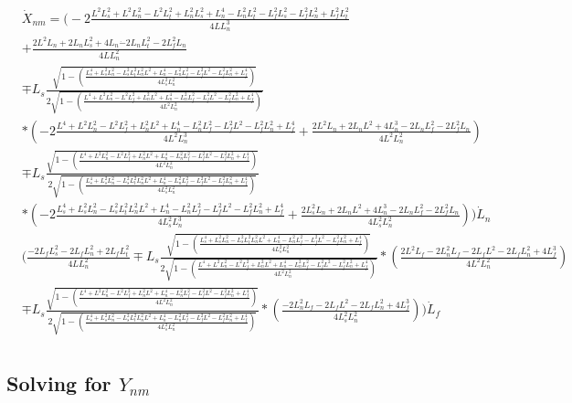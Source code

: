 \documentclass[11pt, landscape]{article}
\begin{document}
\[
\begin{aligned}
  &\dot{X}_{nm}  = \Bigg(-2\frac{L^2L_s^2 + L^2L_n^2 - L^2L_t^2 + L_n^2L_s^2 + L_n^4 - L_n^2L_t^2 - L_f^2L_s^2 - L_f^2L_n^2 + L_f^2L_t^2}{4LL_{n}^3}\\
  &+ \frac{2L^2L_n + 2L_nL_s^2 + 4L_n\dot - 2L_nL_t^2 - 2L_f^2L_n}{4LL_{n}^2}\\
  &\mp L_s\frac{\sqrt{1-\left(\frac{L_s^4 + L_s^2L_n^2 - L_s^2L_t^2 L_n^2L^2 + L_n^4 - L_n^2L_f^2 - L_f^2L^2 - L_f^2L_n^2 + L_f^4}{4L_{s}^2L_{n}^2}\right)}}{2\sqrt{1 - \left(\frac{L^4 + L^2L_n^2 - L^2L_f^2 + L_n^2L^2 + L_n^4 - L_n^2L_f^2 - L_f^2L^2 - L_f^2L_n^2 + L_f^4}{4L^2L_{n}^2}\right)}}\\
  &*\left(-2\frac{L^4 + L^2L_n^2 - L^2L_f^2 + L_n^2L^2 + L_n^4 - L_n^2L_f^2 - L_f^2L^2 - L_f^2L_n^2 + L_f^4}{4L^2L_{n}^3} + \frac{2L^2L_n + 2L_nL^2 + 4L_n^3 - 2L_nL_f^2 - 2L_f^2L_n}{4L^2L_{n}^2}\right)\\
  &\mp L_s\frac{\sqrt{1 - \left(\frac{L^4 + L^2L_n^2 - L^2L_f^2 + L_n^2L^2 + L_n^4 - L_n^2L_f^2 - L_f^2L^2 - L_f^2L_n^2 + L_f^4}{4L^2L_{n}^2}\right)}}{2\sqrt{1-\left(\frac{L_s^4 + L_s^2L_n^2 - L_s^2L_t^2 L_n^2L^2 + L_n^4 - L_n^2L_f^2 - L_f^2L^2 - L_f^2L_n^2 + L_f^4}{4L_{s}^2L_{n}^2}\right)}}\\
  &*\left(-2\frac{L_s^4 + L_s^2L_n^2 - L_s^2L_t^2 L_n^2L^2 + L_n^4 - L_n^2L_f^2 - L_f^2L^2 - L_f^2L_n^2 + L_f^4}{4L_{s}^2L_{n}^3} + \frac{2L_s^2L_n + 2L_nL^2 + 4L_n^3 - 2L_nL_f^2 - 2L_f^2L_n}{4L_{s}^2L_{n}^2}\right)\Bigg)\dot{L}_n\\
  &\Bigg(\frac{-2L_fL_s^2 - 2L_fL_n^2 + 2L_fL_t^2}{4LL_{n}^2}
  \mp L_s\frac{\sqrt{1-\left(\frac{L_s^4 + L_s^2L_n^2 - L_s^2L_t^2 L_n^2L^2 + L_n^4 - L_n^2L_f^2 - L_f^2L^2 - L_f^2L_n^2 + L_f^4}{4L_{s}^2L_{n}^2}\right)}}{2\sqrt{1 - \left(\frac{L^4 + L^2L_n^2 - L^2L_f^2 + L_n^2L^2 + L_n^4 - L_n^2L_f^2 - L_f^2L^2 - L_f^2L_n^2 + L_f^4}{4L^2L_{n}^2}\right)}}
  *\left(\frac{2L^2L_f - 2L_n^2L_f - 2L_fL^2 - 2L_fL_n^2 + 4L_f^3}{4L^2L_{n}^2}\right)\\
  &\mp L_s\frac{\sqrt{1 - \left(\frac{L^4 + L^2L_n^2 - L^2L_f^2 + L_n^2L^2 + L_n^4 - L_n^2L_f^2 - L_f^2L^2 - L_f^2L_n^2 + L_f^4}{4L^2L_{n}^2}\right)}}{2\sqrt{1-\left(\frac{L_s^4 + L_s^2L_n^2 - L_s^2L_t^2 L_n^2L^2 + L_n^4 - L_n^2L_f^2 - L_f^2L^2 - L_f^2L_n^2 + L_f^4}{4L_{s}^2L_{n}^2}\right)}}
  *\left(\frac{-2L_n^2L_f - 2L_fL^2 - 2L_fL_n^2 + 4L_f^3}{4L_{s}^2L_{n}^2}\right)\Bigg)\dot{L}_f\\
\end{aligned}
\]

\subsection{Solving for $Y_{nm}$}
\end{document}
